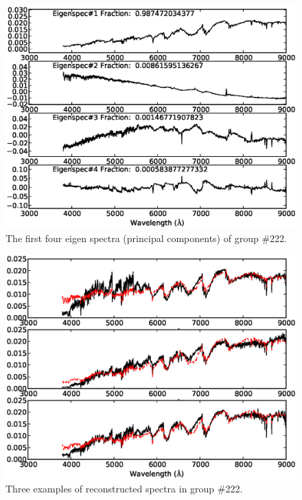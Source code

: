\documentclass[manuscript]{aastex}
\begin{document}
 \begin{figure}
   \centering
   \includegraphics[width=14cm, angle=0,clip]{f74.eps}
   \caption{The first four eigen spectra (principal components) of group \#222.
   }
   \label{Fig74}
\end{figure}

 \begin{figure}
   \centering
   \includegraphics[width=14cm, angle=0,clip]{f84.eps}
   \caption{Three examples of reconstructed spectra in group \#222.
   }
   \label{Fig84}
\end{figure}
\end{document}
